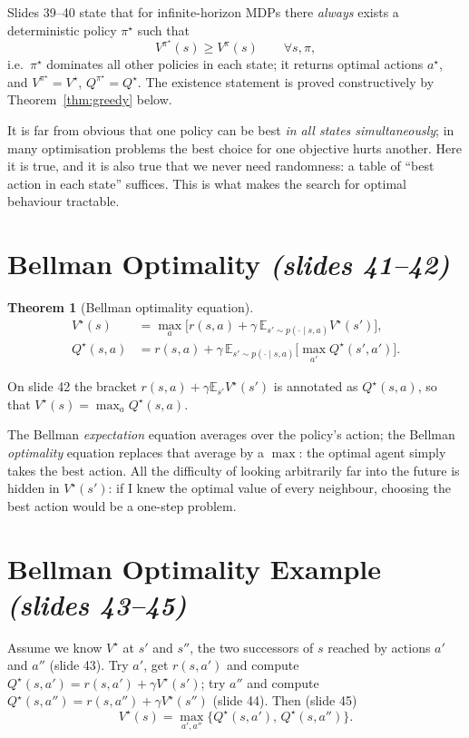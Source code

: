 \documentclass[11pt,a4paper]{article}
\newcommand{\E}{\mathbb{E}}
\newcommand{\slr}[1]{\texorpdfstring{\emph{(slides #1)}}{(slides #1)}}
\theoremstyle{plain}
\newtheorem{theorem}{Theorem}[section]
\theoremstyle{definition}
\theoremstyle{remark}
\begin{document}
Slides 39--40 state that for infinite-horizon MDPs there \emph{always} exists a deterministic policy $\pi^\star$ such that
\[
  V^{\pi^\star}(s)\ge V^\pi(s)\qquad\forall s,\pi,
\]
i.e.\ $\pi^\star$ dominates all other policies in each state; it returns optimal actions $a^\star$, and $V^{\pi^\star}=V^\star$, $Q^{\pi^\star}=Q^\star$. The existence statement is proved constructively by Theorem~\ref{thm:greedy} below.

\begin{intuition}
It is far from obvious that one policy can be best \emph{in all states simultaneously}; in many optimisation problems the best choice for one objective hurts another. Here it is true, and it is also true that we never need randomness: a table of ``best action in each state'' suffices. This is what makes the search for optimal behaviour tractable.
\end{intuition}

\section{Bellman Optimality \slr{41--42}}
\begin{theorem}[Bellman optimality equation]\label{thm:bellopt}
\begin{align*}
 V^\star(s)&=\max_a\Big[r(s,a)+\gamma\,\E_{s'\sim p(\cdot\mid s,a)}V^\star(s')\Big],\\
 Q^\star(s,a)&=r(s,a)+\gamma\,\E_{s'\sim p(\cdot\mid s,a)}\Big[\max_{a'}Q^\star(s',a')\Big].
\end{align*}
\end{theorem}
On slide 42 the bracket $r(s,a)+\gamma\E_{s'}V^\star(s')$ is annotated as $Q^\star(s,a)$, so that $V^\star(s)=\max_aQ^\star(s,a)$.

\begin{intuition}
The Bellman \emph{expectation} equation averages over the policy's action; the Bellman \emph{optimality} equation replaces that average by a $\max$: the optimal agent simply takes the best action. All the difficulty of looking arbitrarily far into the future is hidden in $V^\star(s')$: if I knew the optimal value of every neighbour, choosing the best action would be a one-step problem.
\end{intuition}

\section{Bellman Optimality Example \slr{43--45}}
Assume we know $V^\star$ at $s'$ and $s''$, the two successors of $s$ reached by actions $a'$ and $a''$ (slide 43). Try $a'$, get $r(s,a')$ and compute $Q^\star(s,a')=r(s,a')+\gamma V^\star(s')$; try $a''$ and compute $Q^\star(s,a'')=r(s,a'')+\gamma V^\star(s'')$ (slide 44). Then (slide 45)
\[
  V^\star(s)=\max_{a',a''}\{Q^\star(s,a'),\,Q^\star(s,a'')\}.
\]
\end{document}

